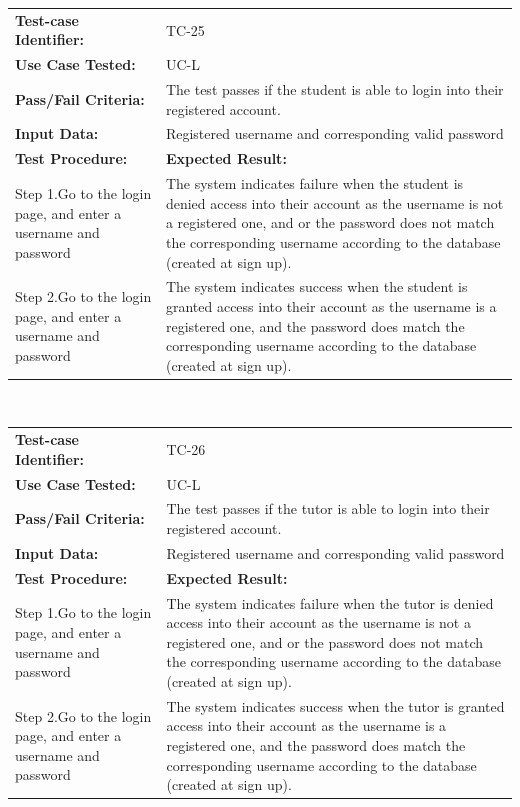 \documentclass[12pt]{article}
\begin{document}
\begin{tabular}{| p{8cm} | p{8cm} |} \hline
	\textbf{Test-case Identifier:}& TC-25\\
	\textbf{Use Case Tested:}& UC-L\\
	\textbf{Pass/Fail Criteria:}& The test passes if the student is able to login into their registered account.\\
	\textbf{Input Data:}& Registered username and corresponding valid password\\\hline
	\textbf{Test Procedure:}& \textbf{Expected Result:} \\\hline
	Step 1.Go to the login page, and enter a username and password & The system indicates failure when the student is denied access into their account as the username is not a registered one, and or the password does not match the corresponding username according to the database (created at sign up). \\
	Step 2.Go to the login page, and enter a username and password & The system indicates success when the student is granted access into their account as the username is  a registered one, and  the password does  match the corresponding username according to the database (created at sign up).\\
		\hline
\end{tabular}
\\

\begin{tabular}{| p{8cm} | p{8cm} |} \hline
	\textbf{Test-case Identifier:}& TC-26\\
	\textbf{Use Case Tested:}& UC-L\\
	\textbf{Pass/Fail Criteria:}& The test passes if the tutor is able to login into their registered account.\\
	\textbf{Input Data:}& Registered username and corresponding valid password\\\hline
	\textbf{Test Procedure:}& \textbf{Expected Result:} \\\hline
	Step 1.Go to the login page, and enter a username and password & The system indicates failure when the tutor is denied access into their account as the username is not a registered one, and or the password does not match the corresponding username according to the database (created at sign up). \\
	Step 2.Go to the login page, and enter a username and password & The system indicates success when the tutor is granted access into their account as the username is  a registered one, and  the password does  match the corresponding username according to the database (created at sign up).\\
		\hline
\end{tabular}
\\
\end{document}
